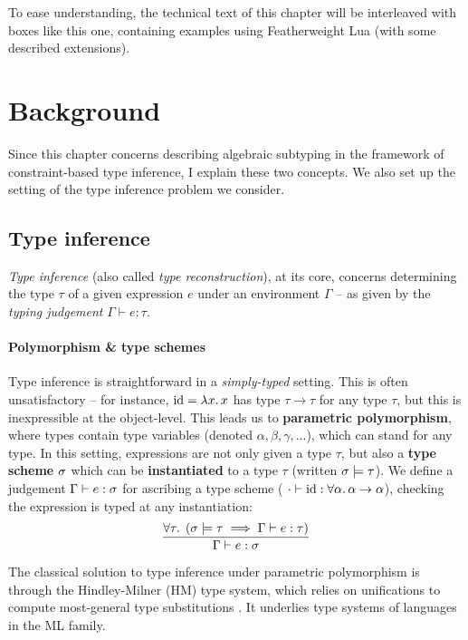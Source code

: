 \begin{example}
    To ease understanding, the technical text of this chapter will be interleaved with boxes like this one, containing examples using Featherweight Lua (with some described extensions).
\end{example}

\section{Background}
\label{sec:ch3background}

Since this chapter concerns describing algebraic subtyping in the framework of constraint-based type inference, I explain these two concepts. We also set up the setting of the type inference problem we consider. 

\subsection{Type inference}
\emph{Type inference} (also called \emph{type reconstruction}), at its core, concerns determining the type $\tau$ of a given expression $e$ under an environment $\Gamma$ -- as given by the \emph{typing judgement} $\Gamma \vdash e : \tau$.

\paragraph{Polymorphism \& type schemes} Type inference is straightforward in a \emph{simply-typed} setting. This is often unsatisfactory -- for instance, $\mathrm{id} =  \lambda x \ldotp x$ has type $\tau \to \tau$ for any type $\tau$, but this is inexpressible at the object-level.
This leads us to \textbf{parametric polymorphism}, where types contain type variables (denoted $\alpha, \beta, \gamma, \dots$), which can stand for any type. 
In this setting, expressions are not only given a type $\tau$, but also a \textbf{type scheme} $\sigma$ which can be \textbf{instantiated} to a type $\tau$ (written $\sigma \models \tau$). We define a judgement $\Gamma \vdash e : \sigma$ for ascribing a type scheme (\eg{} $\cdot \vdash \mathrm{id} : \forall \alpha \ldotp \alpha \to \alpha$), checking the expression is typed at any instantiation:
$$ \dfrac{\forall \tau \ldotp\; \left( \sch \models \tau \implies \Gamma \vdash e : \tau \right)}{\Gamma \vdash e : \sch} $$

The classical solution to type inference under parametric polymorphism is through the Hindley-Milner (HM) type system, which relies on unifications to compute most-general type substitutions \cite{essence-of-ml-type-inference, tapl}. It underlies type systems of languages in the ML family.

